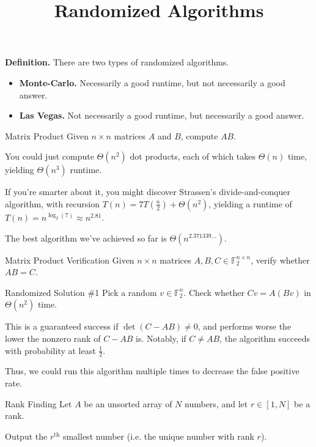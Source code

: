 \title{Randomized Algorithms}



\textbf{Definition.} There are two types of randomized algorithms.
\begin{itemize}
    \item \textbf{Monte-Carlo.} Necessarily a good runtime, but not necessarily a good answer.
    \item \textbf{Las Vegas.} Not necessarily a good runtime, but necessarily a good answer.
\end{itemize}

\begin{problem}{Matrix Product}
    Given $n \times n$ matrices $A$ and $B$, compute $AB$.
\end{problem}

You could just compute $\Theta(n^2)$ dot products, each of which takes $\Theta(n)$ time, yielding $\Theta(n^3)$ runtime.

\begin{remark}
    If you're smarter about it, you might discover Strassen's divide-and-conquer algorithm, with recursion $T(n) = 7T\left(\frac{n}{2}\right) + \Theta(n^2)$, yielding a runtime of $T(n) = n^{\log_2(7)} \approx n^{2.81}$.
    
    The best algorithm we've achieved so far is $\Theta(n^{2.371339\dots})$.
\end{remark}

\begin{problem}{Matrix Product Verification}
Given $n \times n$ matrices $A, B, C \in \mathbb{F}_2^{n \times n}$, verify whether $AB = C$.
\end{problem}

\begin{solution}{Randomized Solution \#1}
    Pick a random $v \in \mathbb{F}_2^n$.  Check whether $Cv = A(Bv)$ in $\Theta(n^2)$ time.
\end{solution}

This is a guaranteed success if $\det(C - AB) \neq 0$, and performs worse the lower the nonzero rank of $C - AB$ is.  Notably, if $C \neq AB$, the algorithm succeeds with probability at least $\frac{1}{2}$.

Thus, we could run this algorithm multiple times to decrease the false positive rate.

\begin{problem}{Rank Finding}
    Let $A$ be an unsorted array of $N$ numbers, and let $r \in [1, N]$ be a rank.
    
    Output the $r^{\text{th}}$ smallest number (i.e. the unique number with rank $r$).
\end{problem}

